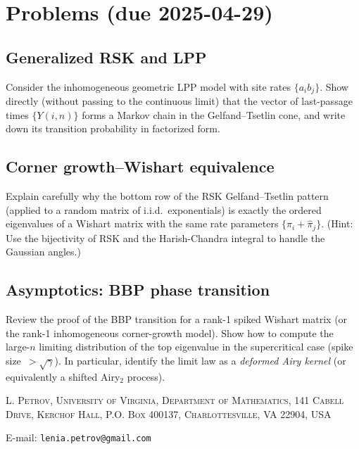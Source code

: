 \documentclass[letterpaper,11pt,oneside,reqno]{article}
\numberwithin{equation}{section}
\theoremstyle{definition}
\begin{document}
\appendix
\setcounter{section}{12}

\section{Problems (due 2025-04-29)}

\subsection{Generalized RSK and LPP}
Consider the inhomogeneous geometric LPP model with site rates \(\{a_i b_j\}\).  Show directly (without passing to the continuous limit) that the vector of last-passage times \(\{Y(i,n)\}\) forms a Markov chain in the Gelfand--Tsetlin cone, and write down its transition probability in factorized form.

\subsection{Corner growth--Wishart equivalence}
Explain carefully why the bottom row of the RSK Gelfand--Tsetlin pattern (applied to a random matrix of i.i.d.\ exponentials) is exactly the ordered eigenvalues of a Wishart matrix with the same rate parameters \(\{\pi_i+\hat\pi_j\}\).  (Hint:  Use the bijectivity of RSK and the Harish-Chandra integral to handle the Gaussian angles.)

\subsection{Asymptotics: BBP phase transition}
Review the proof of the BBP transition for a rank-1 spiked Wishart matrix (or the rank-1 inhomogeneous corner-growth model).  Show how to compute the large-\(n\) limiting distribution of the top eigenvalue in the supercritical case (spike size~$>\sqrt{\gamma}$).  In particular, identify the limit law as a \emph{deformed Airy kernel} (or equivalently a shifted Airy$_2$ process).








\medskip

\textsc{L. Petrov, University of Virginia, Department of Mathematics, 141 Cabell Drive, Kerchof Hall, P.O. Box 400137, Charlottesville, VA 22904, USA}

E-mail: \texttt{lenia.petrov@gmail.com}
\end{document}
